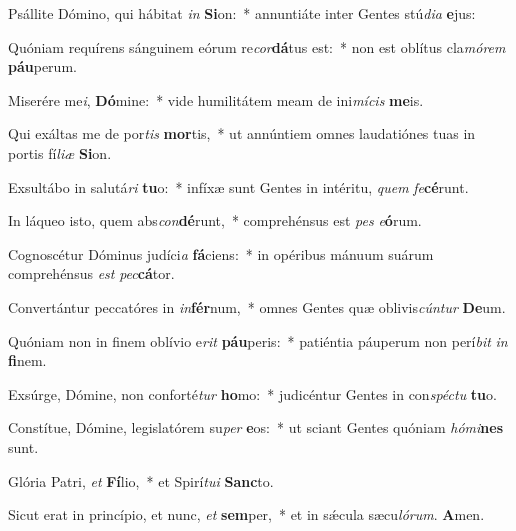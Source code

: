 \item Psállite Dómino, qui hábitat \textit{in} \textbf{Si}on:~* annuntiáte inter Gentes stú\textit{di}\textit{a} \textbf{e}jus:
\item Quóniam requírens sánguinem eórum re\textit{cor}\textbf{dá}tus est:~* non est oblítus cla\textit{mó}\textit{rem} \textbf{páu}perum.
\item Miserére me\textit{i}, \textbf{Dó}mine:~* vide humilitátem meam de ini\textit{mí}\textit{cis} \textbf{me}is.
\item Qui exáltas me de por\textit{tis} \textbf{mor}tis,~* ut annúntiem omnes laudatiónes tuas in portis fí\textit{li}\textit{æ} \textbf{Si}on.
\item Exsultábo in salutá\textit{ri} \textbf{tu}o:~* infíxæ sunt Gentes in intéritu, \textit{quem} \textit{fe}\textbf{cé}runt.
\item In láqueo isto, quem abs\textit{con}\textbf{dé}runt,~* comprehénsus est \textit{pes} \textit{e}\textbf{ó}rum.
\item Cognoscétur Dóminus judíci\textit{a} \textbf{fá}ciens:~* in opéribus mánuum suárum comprehénsus \textit{est} \textit{pec}\textbf{cá}tor.
\item Convertántur peccatóres in \textit{in}\textbf{fér}num,~* omnes Gentes quæ oblivis\textit{cún}\textit{tur} \textbf{De}um.
\item Quóniam non in finem oblívio e\textit{rit} \textbf{páu}peris:~* patiéntia páuperum non perí\textit{bit} \textit{in} \textbf{fi}nem.
\item Exsúrge, Dómine, non conforté\textit{tur} \textbf{ho}mo:~* judicéntur Gentes in con\textit{spéctu} \textbf{tu}o.
\item Constítue, Dómine, legislatórem su\textit{per} \textbf{e}os:~* ut sciant Gentes quóniam \textit{hómi}\textbf{nes} sunt.
\item Glória Patri, \textit{et} \textbf{Fí}lio,~* et Spirí\textit{tu}\textit{i} \textbf{Sanc}to.
\item Sicut erat in princípio, et nunc, \textit{et} \textbf{sem}per,~* et in sǽcula sæcu\textit{ló}\textit{rum}. \textbf{A}men.
